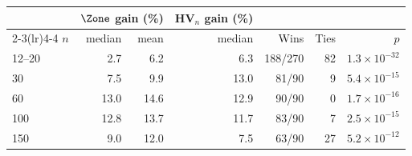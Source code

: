 \begin{tabular}{@{}lrrrrrr@{}}
\toprule
 & \multicolumn{2}{c}{$\Zone$ gain (\%)} & HV$_n$ gain (\%) & & & \\
\cmidrule(lr){2-3}\cmidrule(lr){4-4}
$n$ & median & mean & median & Wins & Ties & $p$ \\
\midrule
12--20 & 2.7 & 6.2 & 6.3 & 188/270 & 82 & $1.3\times 10^{-32}$ \\
30 & 7.5 & 9.9 & 13.0 & 81/90 & 9 & $5.4\times 10^{-15}$ \\
60 & 13.0 & 14.6 & 12.9 & 90/90 & 0 & $1.7\times 10^{-16}$ \\
100 & 12.8 & 13.7 & 11.7 & 83/90 & 7 & $2.5\times 10^{-15}$ \\
150 & 9.0 & 12.0 & 7.5 & 63/90 & 27 & $5.2\times 10^{-12}$ \\
\bottomrule
\end{tabular}

